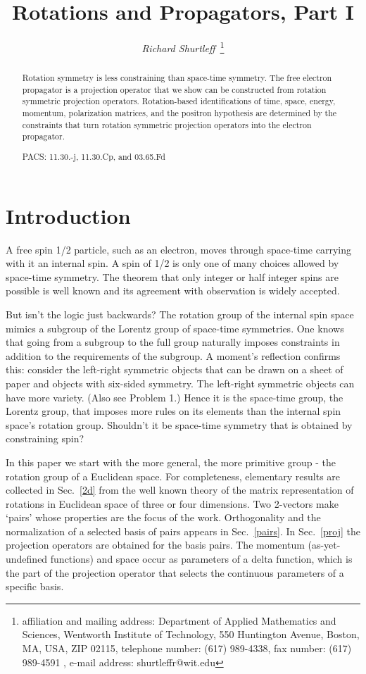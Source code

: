 \documentclass[a4paper,12pt]{article}
\title{ Rotations and \myHighlight{$e,$}\coordHE{}  \myHighlight{$\nu$}\coordHE{} Propagators, Part I}
\author{{\it Richard Shurtleff~}\thanks{affiliation and mailing 
address: Department of Applied Mathematics and Sciences, 
Wentworth Institute of Technology, 550 Huntington Avenue, 
Boston, MA, USA, ZIP 02115, telephone number: (617) 989-4338, fax 
number: (617) 989-4591 , e-mail address: shurtleffr@wit.edu}}
\begin{document}
 
          
\maketitle               
			\begin{abstract}  

Rotation symmetry is less constraining than space-time symmetry. The free electron propagator is a projection operator that we show can be constructed from rotation symmetric projection operators. Rotation-based identifications of time, space, energy, momentum, polarization matrices, and the positron hypothesis are determined by the constraints that turn rotation symmetric projection operators into the electron propagator. 

	PACS: 11.30.-j, 11.30.Cp, and 03.65.Fd 
 
\end{abstract}

\pagebreak

\section{Introduction} \label{intro} %

	A free spin 1/2 particle, such as an electron, moves through space-time carrying with it an internal spin. A spin of 1/2 is only one of many choices allowed by space-time symmetry. The theorem that only integer or half integer spins are possible is well known \cite{wigner} and its agreement with observation is widely accepted.

	But isn't the logic just backwards? The rotation group of the internal spin space mimics a subgroup of the Lorentz group of space-time symmetries. One knows that going from a subgroup to the full group naturally imposes constraints in addition to the requirements of the subgroup. A moment's reflection confirms this: consider the left-right symmetric objects that can be drawn on a sheet of paper and objects with six-sided symmetry. The left-right symmetric objects can have more variety. (Also see Problem 1.) Hence it is the space-time group, the Lorentz group, that imposes more rules on its elements than the internal spin space's rotation group. Shouldn't it be space-time symmetry that is obtained by constraining spin?

	In this paper we start with the more general, the more primitive group - the rotation group of a Euclidean space. For completeness, elementary results are collected in Sec.~\ref{2d} from the well known theory of the \coordHE{} matrix representation of rotations in Euclidean space of three or four dimensions. Two 2-vectors make `pairs' whose properties are the focus of the work. Orthogonality and the normalization of a selected basis of pairs appears in Sec.~\ref{pairs}. In Sec.~\ref{proj} the projection operators are obtained for the basis pairs. The momentum (as-yet-undefined functions) and space occur as parameters of a delta function, which is the part of the projection operator that selects the continuous parameters of a specific basis. 
\end{document}
